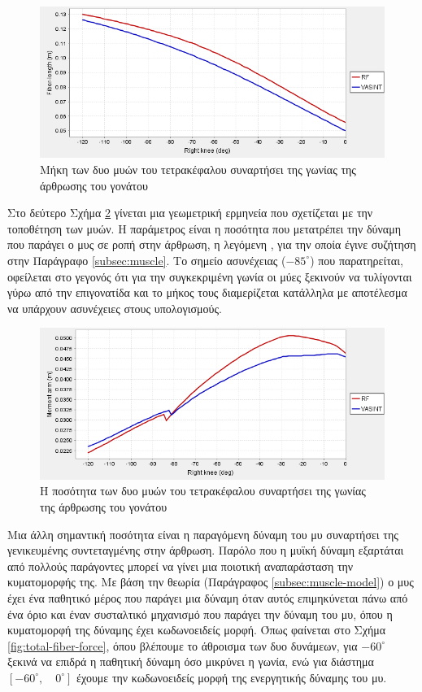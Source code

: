 \begin{figure}[H]
    \centering
    \includegraphics[width=0.8\linewidth, keepaspectratio]{fig/fiber-length-vs-knee-angle.png}
    \caption{Μήκη των δυο μυών του τετρακέφαλου συναρτήσει της γωνίας της άρθρωσης του γονάτου}
    \label{fig:iber-length-vs-knee-angle}
\end{figure}

Στο δεύτερο Σχήμα \ref{fig:moment-arm-vs-knee-angle} γίνεται μια γεωμετρική ερμηνεία που σχετίζεται με την τοποθέτηση των μυών. Η παράμετρος είναι η ποσότητα που μετατρέπει την δύναμη που παράγει ο μυς σε ροπή στην άρθρωση, η λεγόμενη , για την οποία έγινε συζήτηση στην Παράγραφο \ref{subsec:muscle}. Το σημείο ασυνέχειας ($-85^{\circ}$) που παρατηρείται, οφείλεται στο γεγονός ότι για την συγκεκριμένη γωνία οι μύες ξεκινούν να τυλίγονται γύρω από την επιγονατίδα και το μήκος τους διαμερίζεται κατάλληλα με αποτέλεσμα να υπάρχουν ασυνέχειες στους υπολογισμούς.

\begin{figure}[H]
    \centering
    \includegraphics[width=0.8\linewidth, keepaspectratio]{fig/moment-arm-vs-knee-angle.png}
    \caption{Η ποσότητα  των δυο μυών του τετρακέφαλου συναρτήσει της γωνίας της άρθρωσης του γονάτου}
    \label{fig:moment-arm-vs-knee-angle}
\end{figure}

Μια άλλη σημαντική ποσότητα είναι η παραγόμενη δύναμη του μυ συναρτήσει της γενικευμένης συντεταγμένης στην άρθρωση. Παρόλο που η μυϊκή δύναμη εξαρτάται από πολλούς παράγοντες μπορεί να γίνει μια ποιοτική αναπαράσταση την κυματομορφής της. Με βάση την θεωρία (Παράγραφος \ref{subsec:muscle-model}) ο μυς έχει ένα παθητικό μέρος που παράγει μια δύναμη όταν αυτός επιμηκύνεται πάνω από ένα όριο και έναν συσταλτικό μηχανισμό που παράγει την δύναμη του μυ, όπου η κυματομορφή της δύναμης έχει κωδωνοειδείς μορφή. Όπως φαίνεται στο Σχήμα \ref{fig:total-fiber-force}, όπου βλέπουμε το άθροισμα των δυο δυνάμεων, για $-60^{\circ}$ ξεκινά να επιδρά η παθητική δύναμη όσο μικρύνει η γωνία, ενώ για διάστημα $[-60^{\circ},\quad 0^{\circ}]$ έχουμε την κωδωνοειδείς μορφή της ενεργητικής δύναμης του μυ.

